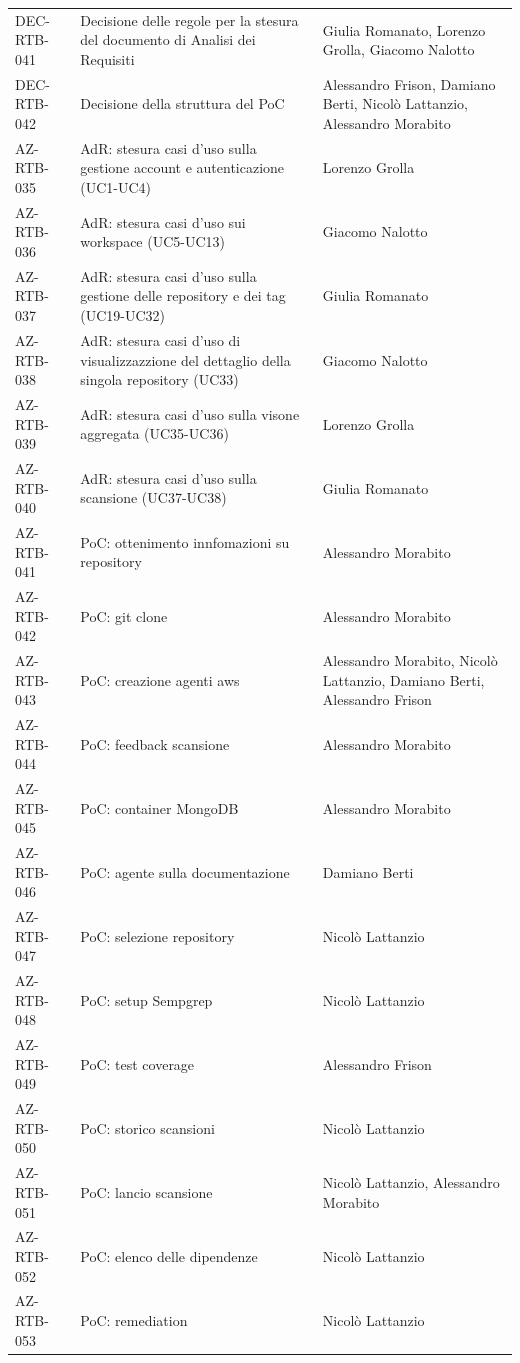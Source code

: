 \documentclass[a4paper, 11pt]{article}
\begin{document}
\begin{center}
\begin{longtable}{>{\centering\arraybackslash}m{3cm} >{\raggedright\arraybackslash}p{7cm} >{\centering\arraybackslash}p{2.5cm}}
        DEC-RTB-041 & Decisione delle regole per la stesura del documento di Analisi dei Requisiti & Giulia Romanato, Lorenzo Grolla, Giacomo Nalotto \\
        DEC-RTB-042 & Decisione della struttura del PoC & Alessandro Frison, Damiano Berti, Nicolò Lattanzio, Alessandro Morabito \\
        \midrule
        AZ-RTB-035 & AdR: stesura casi d'uso sulla gestione account e autenticazione (UC1-UC4) & Lorenzo Grolla\\
        AZ-RTB-036 & AdR: stesura casi d'uso sui workspace (UC5-UC13) & Giacomo Nalotto\\
        AZ-RTB-037 & AdR: stesura casi d'uso sulla gestione delle repository e dei tag (UC19-UC32) & Giulia Romanato\\
        AZ-RTB-038 & AdR: stesura casi d'uso di visualizzazzione del dettaglio della singola repository (UC33) & Giacomo Nalotto\\
        AZ-RTB-039 & AdR: stesura casi d'uso sulla visone aggregata (UC35-UC36) & Lorenzo Grolla\\
        AZ-RTB-040 & AdR: stesura casi d'uso sulla scansione (UC37-UC38) & Giulia Romanato\\
        AZ-RTB-041 & PoC: ottenimento innfomazioni su repository & Alessandro Morabito\\
        AZ-RTB-042 & PoC: git clone & Alessandro Morabito\\
        AZ-RTB-043 & PoC: creazione agenti aws & Alessandro Morabito, Nicolò Lattanzio, Damiano Berti, Alessandro Frison\\
        AZ-RTB-044 & PoC: feedback scansione & Alessandro Morabito\\
        AZ-RTB-045 & PoC: container MongoDB & Alessandro Morabito\\
        AZ-RTB-046 & PoC: agente sulla documentazione & Damiano Berti\\
        AZ-RTB-047 & PoC: selezione repository & Nicolò Lattanzio\\
        AZ-RTB-048 & PoC: setup Sempgrep & Nicolò Lattanzio\\
        AZ-RTB-049 & PoC: test coverage & Alessandro Frison\\
        AZ-RTB-050 & PoC: storico scansioni & Nicolò Lattanzio\\
        AZ-RTB-051 & PoC: lancio scansione & Nicolò Lattanzio, Alessandro Morabito\\
        AZ-RTB-052 & PoC: elenco delle dipendenze & Nicolò Lattanzio\\
        AZ-RTB-053 & PoC: remediation & Nicolò Lattanzio
    \end{longtable}
\end{center}
\end{document}

